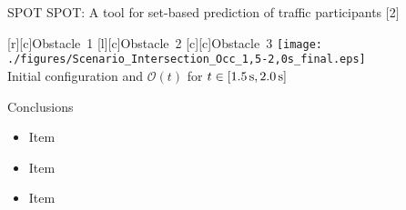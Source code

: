 


\begin{frame}{SPOT}
SPOT: A tool for set-based prediction of traffic participants $[$2$]$%
\vspace{1em}

\begin{center}
	{\footnotesize
	[c]{Obstacle~1}	
	[c]{Obstacle~2}
	[c]{Obstacle~3}
	\texttt{[image: ./figures/Scenario\_Intersection\_Occ\_1,5-2,0s\_final.eps]}
	} \\
	\vspace{1em}
	Initial configuration and $\mathcal{O}(t)$ for $t \in [\unit[1.5]{s}, \unit[2.0]{s}]$
\end{center}

\end{frame}

\begin{frame}{Conclusions}

\begin{itemize}
\item Item
\vfill \item  Item
\vfill \item  Item
\end{itemize}

\end{frame}


